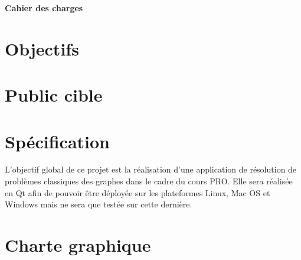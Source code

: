 \documentclass[french]{article}
\begin{document}
	\centering
	\LARGE{\textbf{Cahier des charges}}
  \large

	\justify

  \section{Objectifs}

  \section{Public cible}

	\section{Spécification}
		L'objectif global de ce projet est la réalisation d'une application de résolution de problèmes classiques des graphes dans le cadre du cours PRO. Elle sera réalisée en Qt afin de pouvoir être déployée sur les plateformes Linux, Mac OS et Windows mais ne sera que testée sur cette dernière.

  \section{Charte graphique}
\end{document}

